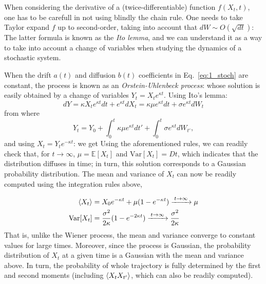 When considering the derivative of a (twice-differentiable) function $f(X_t,t)$, one has to be carefull in not using blindly the chain rule. One needs to take Taylor expand $f$ up to second-order, taking into account that $dW\sim O(\sqrt{dt})$:
The latter formula is known as the \textit{Ito lemma}, and we can understand it as a way to take into account a change of variables when studying the dynamics of a stochastic system.

When the drift $a(t)$ and diffusion $b(t)$ coefficients in Eq.~\ref{eq:1_stoch} are constant, the process is known as an \textit{Orstein-Uhlenbeck process}:
whose solution is easily obtained by a change of variables $Y_{t}= X_{t} e^{\kappa t}$. Using Ito's lemma:
$$dY=\kappa X_{t}e^{\kappa t} dt+e^{\kappa t} dX_{t}=\kappa \mu e^{\kappa t} dt+\sigma e^{\kappa t} dW_{t}$$
from where
$$Y_{t}=Y_{0}+\int_{0}^{t}\kappa \mu e^{\kappa t} dt'+\int_{0}^{t}\sigma e^{\kappa t} dW_{t'},$$
and using  $X_{t}= Y_{t} e^{-\kappa t}$:
we get
Using the aforementioned rules, we can readily check that, for $t\rightarrow\infty$,
$\mu = \mathbb{E}[X_t]$ and $\text{Var}[X_t]=Dt$, which indicates that the distribution diffuses in time; in turn, this solution corresponds to a Gaussian probability distribution.
The mean and variance of $X_{t}$ can now be readily computed using the integration rules above,

\begin{align}
\mathinner{\langle X_{t}\rangle}&=X_{0} e^{-\kappa t}+\mu(1-e^{-\kappa t}) \xrightarrow{\: t \to \infty \: } \mu \\
\text{Var}[X_t]&= \frac{\sigma^{2}}{2\kappa}(1-e^{-2\kappa t}) \xrightarrow{\: t \to \infty \: } \frac{\sigma^{2}}{2\kappa}
\end{align}
That is, unlike the Wiener process, the mean and variance converge to constant values for large times.
Moreover, since the process is Gaussian, the probability distribution of $X_{t}$ at a given time is a Gaussian with the mean and variance above. In turn, the probability of whole trajectory is fully determined by the first and second moments (including $\mathinner{\langle X_{t}X_{t'}\rangle}$, which can also be readily computed).

